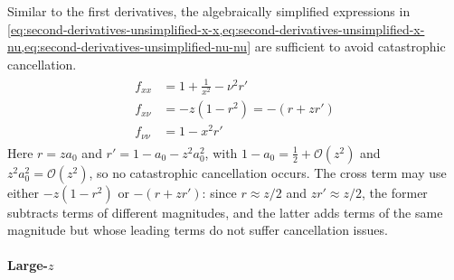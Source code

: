 \documentclass{article}
\begin{document}
Similar to the first derivatives, the algebraically simplified expressions in \cref{eq:second-derivatives-unsimplified-x-x,eq:second-derivatives-unsimplified-x-nu,eq:second-derivatives-unsimplified-nu-nu} are sufficient to avoid catastrophic cancellation.
%
%
\begin{align}\label{eq:second-derivatives-small-z}
  \boxed{
    \begin{aligned}
      f_{xx}     & = 1 + \frac{1}{x^2} - \nu^2 r' \\
      f_{x\nu}   & = -z (1 - r^2) = -(r+z r')     \\
      f_{\nu\nu} & = 1 - x^2 r'
    \end{aligned}
  }
\end{align}
%
Here $r= z a_0$ and $r' = 1-a_0 - z^2 a_0^2$, with $1-a_0=\frac{1}{2}+\mathcal{O}(z^2)$ and $z^2 a_0^2=\mathcal{O}(z^2)$, so no catastrophic cancellation occurs.
The cross term may use either $-z(1-r^2)$ or $-(r+z r')$:
since $r \approx z/2$ and $zr' \approx z/2$, the former subtracts terms of different magnitudes, and the latter adds terms of the same magnitude but whose leading terms do not suffer cancellation issues.

\paragraph{Large-$z$}
\end{document}
